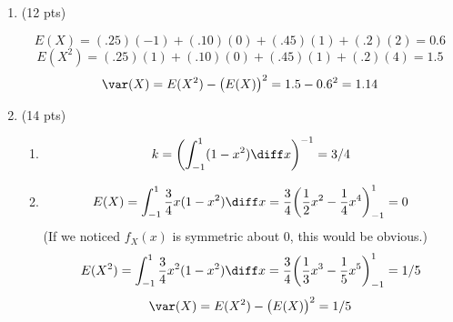 \documentclass[12pt]{article}
\begin{document}
\begin{enumerate}
\item (12 pts)

\[
E(X) = (.25)(-1) + (.10)(0) + (.45)(1) + (.2)(2) = 0.6
\]
\[
E(X^2) = (.25)(1) + (.10)(0) + (.45)(1) + (.2)(4) = 1.5
\]
\[
\var(X) = E(X^2) - \bigl(E(X)\bigr)^2 = 1.5 - 0.6^2 = 1.14
\]

\item (14 pts)

\begin{enumerate}
\item
\[
k = \biggl(\int_{-1}^1 (1 - x^2) \diff x\bigg)^{-1} = 3/4
\]

\item
\[
E(X)
= \int_{-1}^1 \frac{3}{4} x (1 - x^2) \diff x
= \frac{3}{4}\biggl(\frac{1}{2}x^2 - \frac{1}{4}x^4\biggr)_{-1}^1
= 0
\]
(If we noticed $f_X(x)$ is symmetric about 0,
this would be obvious.)
\[
E(X^2)
= \int_{-1}^1 \frac{3}{4} x^2 (1 - x^2) \diff x
= \frac{3}{4}\biggl(\frac{1}{3}x^3 - \frac{1}{5}x^5\biggr)_{-1}^1
= 1/5
\]
\[
\var(X) = E(X^2) - \bigl(E(X)\bigr)^2 = 1/5
\]

\end{enumerate}
\end{enumerate}
\end{document}
